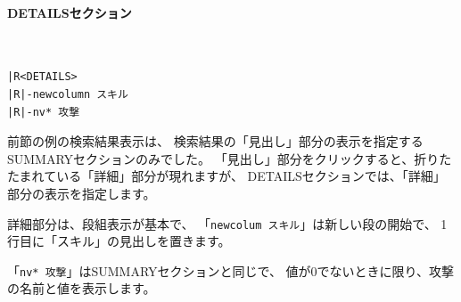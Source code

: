 \documentclass[dvipdfmx]{jsarticle}
\begin{document}
\begin{center}
\end{center}

\paragraph{DETAILSセクション}~\medskip
{\footnotesize\begin{mdframed}\begin{Verbatim}[commandchars=|<>]
|R<DETAILS>
|R|-newcolumn スキル
|R|-nv* 攻撃
\end{Verbatim}
\end{mdframed}}
\medskip

前節の例の検索結果表示は、
検索結果の「見出し」部分の表示を指定するSUMMARYセクションのみでした。
「見出し」部分をクリックすると、折りたたまれている「詳細」部分が現れますが、
DETAILSセクションでは、「詳細」部分の表示を指定します。

詳細部分は、段組表示が基本で、
「\texttt{newcolum スキル}」は新しい段の開始で、
1行目に「スキル」の見出しを置きます。

「\texttt{nv* 攻撃}」はSUMMARYセクションと同じで、
値が0でないときに限り、攻撃の名前と値を表示します。

\begin{center}
\end{center}
\end{document}
